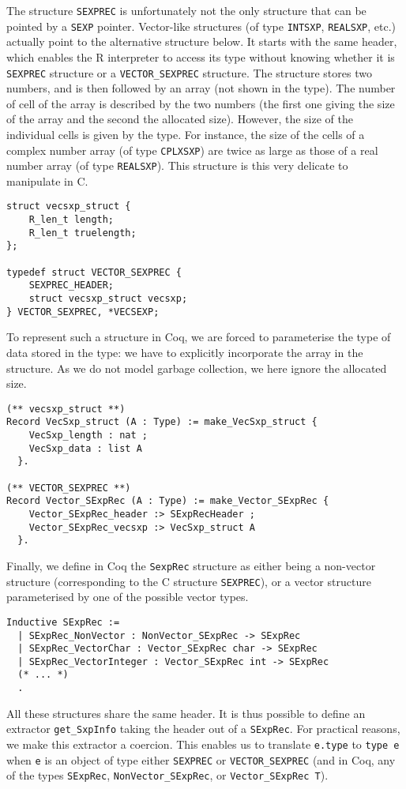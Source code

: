 \documentclass{article}
\newcommand\Coq{Coq}
\newcommand\R{R}
\newcommand\Cn{C}
\begin{document}
The structure \texttt{SEXPREC} is unfortunately
not the only structure that can be pointed by a \texttt{SEXP} pointer.
Vector-like structures (of type \texttt{INTSXP}, \texttt{REALSXP}, etc.)
actually point to the alternative structure below.
It starts with the same header,
which enables the \R{} interpreter to access its type without
knowing whether it is \texttt{SEXPREC} structure
or a \texttt{VECTOR_SEXPREC} structure.
The structure stores two numbers,
and is then followed by an array
(not shown in the type).
The number of cell of the array is described by the two numbers
(the first one giving the size of the array and the second the allocated size).
However, the size of the individual cells
is given by the type.
For instance, the size of the cells of a complex number array
(of type \texttt{CPLXSXP}) are twice as large
as those of a real number array (of type \texttt{REALSXP}).
This structure is this very delicate to manipulate in \Cn{}.
\begin{verbatim}
struct vecsxp_struct {
    R_len_t length;
    R_len_t truelength;
};

typedef struct VECTOR_SEXPREC {
    SEXPREC_HEADER;
    struct vecsxp_struct vecsxp;
} VECTOR_SEXPREC, *VECSEXP;
\end{verbatim}
To represent such a structure in \Coq{},
we are forced to parameterise the type of data stored
in the type:
we have to explicitly incorporate the array in the structure.
As we do not model garbage collection,
we here ignore the allocated size.
\begin{verbatim}
(** vecsxp_struct **)
Record VecSxp_struct (A : Type) := make_VecSxp_struct {
    VecSxp_length : nat ;
    VecSxp_data : list A
  }.

(** VECTOR_SEXPREC **)
Record Vector_SExpRec (A : Type) := make_Vector_SExpRec {
    Vector_SExpRec_header :> SExpRecHeader ;
    Vector_SExpRec_vecsxp :> VecSxp_struct A
  }.
\end{verbatim}
Finally, we define in \Coq{} the \texttt{SexpRec}
structure as either being a non-vector structure
(corresponding to the \Cn{} structure \texttt{SEXPREC}),
or a vector structure parameterised by one of the possible vector types.
\begin{verbatim}
Inductive SExpRec :=
  | SExpRec_NonVector : NonVector_SExpRec -> SExpRec
  | SExpRec_VectorChar : Vector_SExpRec char -> SExpRec
  | SExpRec_VectorInteger : Vector_SExpRec int -> SExpRec
  (* ... *)
  .
\end{verbatim}
All these structures share the same header.
It is thus possible to define an extractor \texttt{get_SxpInfo}
taking the header out of a \texttt{SExpRec}.
For practical reasons, we make this extractor a coercion.
This enables us to translate \texttt{e.type}
to \texttt{type e} when \texttt{e}
is an object of type either \texttt{SEXPREC}
or \texttt{VECTOR_SEXPREC}
(and in \Coq{},
any of the types \texttt{SExpRec}, \texttt{NonVector_SExpRec},
or \texttt{Vector_SExpRec T}).
\end{document}

